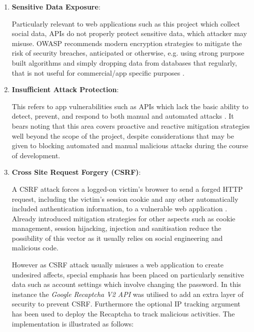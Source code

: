 \begin{enumerate}
\begin{itemize}
    \end{itemize}
    
    
    
    \item \textbf{Sensitive Data Exposure}:
    
    Particularly relevant to web applications such as this project which collect social data, APIs do not properly protect sensitive data, which attacker may misuse. OWASP recommends modern encryption strategies to mitigate the risk of security breaches, anticipated or otherwise, e.g. using strong purpose built algorithms and simply dropping data from databases that regularly, that is not useful for commercial/app specific purposes \cite{OWASP2017}.
    
    \item \textbf{Insufficient Attack Protection}:
    
    This refers to app vulnerabilities such as APIs which lack the basic ability to detect, prevent, and respond to both manual and automated attacks \cite{OWASP2017}. It bears noting that this area covers proactive and reactive mitigation strategies well beyond the scope of the project, despite considerations that may be given to blocking automated and manual malicious attacks during the course of development.
    
    \item \textbf{Cross Site Request Forgery (CSRF)}:
    
    A CSRF attack forces a logged-on victim's browser to send a forged HTTP request, including the victim’s session cookie and any other automatically included authentication information, to a vulnerable web application \cite{OWASP2017}. Already introduced mitigation strategies for other aspects such as cookie management, session hijacking, injection and sanitisation reduce the possibility of this vector as it usually relies on social engineering and malicious code.
    
    However as CSRF attack usually misuses a web application to create undesired affects, special emphasis has been placed on particularly sensitive data such as account settings which involve changing the password. In this instance the \textit{Google Recaptcha V2 API} was utilised to add an extra layer of security to prevent CSRF. Furthermore the optional IP tracking argument has been used to deploy the Recaptcha to track malicious activities. The implementation is illustrated as follows:
  

\end{enumerate}
